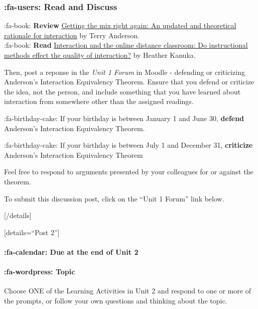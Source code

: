 \documentclass[
]{book}
\begin{document}
\hypertarget{fa-users-read-and-discuss}{%
\subsubsection{:fa-users: Read and Discuss}\label{fa-users-read-and-discuss}}

:fa-book: \textbf{Review} \href{https://www.irrodl.org/index.php/irrodl/article/view/149/230}{Getting the mix right again: An updated and theoretical rationale for interaction} by Terry Anderson.\\
:fa-book: \textbf{Read} \href{https://link-springer-com.ezproxy.student.twu.ca/article/10.1007/s12528-011-9049-4}{Interaction and the online distance classroom: Do instructional methods effect the quality of interaction?} by Heather Kanuka.

Then, post a reponse in the \emph{Unit 1 Forum} in Moodle - defending or criticizing Anderson's Interaction Equivalency Theorem. Ensure that you defend or criticize the idea, not the person, and include something that you have learned about interaction from somewhere other than the assigned readings.

:fa-birthday-cake: If your birthday is between January 1 and June 30, \textbf{defend} Anderson's Interaction Equivalency Theorem.

:fa-birthday-cake: If your birthday is between July 1 and December 31, \textbf{criticize} Anderson's Interaction Equivalency Theorem

Feel free to respond to arguments presented by your colleagues for or against the theorem.

To submit this discussion post, click on the ``Unit 1 Forum'' link below.

{[}/details{]}

{[}details=``Post 2''{]}

\hypertarget{fa-calendar-due-at-the-end-of-unit-2}{%
\paragraph{:fa-calendar: Due at the end of Unit 2}\label{fa-calendar-due-at-the-end-of-unit-2}}

\hypertarget{fa-wordpress-topic}{%
\paragraph{:fa-wordpress: Topic}\label{fa-wordpress-topic}}

Choose ONE of the Learning Activities in Unit 2 and respond to one or more of the prompts, or follow your own questions and thinking about the topic.
\end{document}
